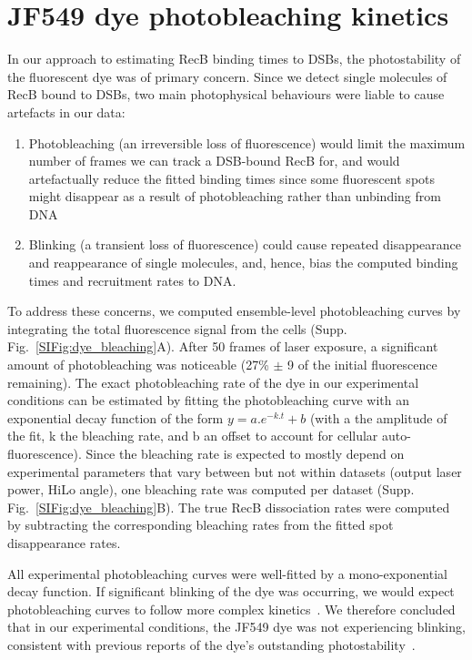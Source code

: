 \captionsetup*{format=largeformat}
\section{JF549 dye photobleaching kinetics}\label{note:dye_bleaching} 

In our approach to estimating RecB binding times to DSBs, the photostability of the fluorescent dye was of primary concern. Since we detect single molecules of RecB bound to DSBs, two main photophysical behaviours were liable to cause artefacts in our data:
\begin{enumerate}
    \item Photobleaching (an irreversible loss of fluorescence) would limit the maximum number of frames we can track a DSB-bound RecB for, and would artefactually reduce the fitted binding times since some fluorescent spots might disappear as a result of photobleaching rather than unbinding from DNA
    \item Blinking (a transient loss of fluorescence) could cause repeated disappearance and reappearance of single molecules, and, hence, bias the computed binding times and recruitment rates to DNA.\@
\end{enumerate}

To address these concerns, we computed ensemble-level photobleaching curves by integrating the total fluorescence signal from the cells (Supp. Fig.~\ref{SIFig:dye_bleaching}A). After 50 frames of laser exposure, a significant amount of photobleaching was noticeable (27\% $\pm$ 9 of the initial fluorescence remaining). The exact photobleaching rate of the dye in our experimental conditions can be estimated by fitting the photobleaching curve with an exponential decay function of the form $y=a.e^{-k.t}+b$ (with a the amplitude of the fit, k the bleaching rate, and b an offset to account for cellular auto-fluorescence). Since the bleaching rate is expected to mostly depend on experimental parameters that vary between but not within datasets (output laser power, HiLo angle), one bleaching rate was computed per dataset (Supp. Fig.~\ref{SIFig:dye_bleaching}B). The true RecB dissociation rates were computed by subtracting the corresponding bleaching rates from the fitted spot disappearance rates.

All experimental photobleaching curves were well-fitted by a mono-exponential decay function. If significant blinking of the dye was occurring, we would expect photobleaching curves to follow more complex kinetics~\cite{Thedie2017}. We therefore concluded that in our experimental conditions, the JF549 dye was not experiencing blinking, consistent with previous reports of the dye's outstanding photostability~\cite{Grimm2015}.

